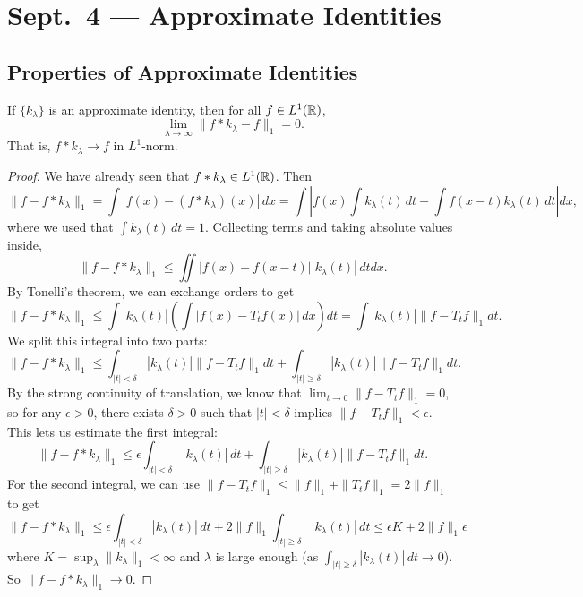 \chapter{Sept.~4 --- Approximate Identities}

\section{Properties of Approximate Identities}

\begin{theorem}
  If $\{k_{\lambda}\}$ is an approximate
  identity, then for all $f \in L^1(\mathbb{R})$,
  \[
    \lim_{\lambda \to \infty} \|f * k_{\lambda} - f\|_1 = 0.
  \]
  That is, $f * k_{\lambda} \to f$ in $L^1$-norm.
\end{theorem}

\begin{proof}
  We have already seen that
  $f * k_{\lambda} \in L^1(\mathbb{R})$. Then
  \[
    \|f - f * k_{\lambda}\|_1
    = \int |f(x) - (f * k_{\lambda})(x)| \, dx
    = \int \left|f(x) \int k_{\lambda}(t)\, dt - \int f(x - t)k_\lambda(t)\, dt\right| dx,
  \]
  where we used that
  $\int k_{\lambda}(t)\, dt = 1$.
  Collecting terms and taking absolute
  values inside,
  \[
    \|f - f * k_{\lambda}\|_1
    \le \iint |f(x) - f(x - t)| |k_{\lambda}(t)|\, dt dx.
  \]
  By Tonelli's theorem, we can
  exchange orders to get
  \[
    \|f - f * k_{\lambda}\|_1
    \le \int |k_{\lambda}(t)| \left(\int |f(x) - T_t f(x)|\, dx\right) dt
    = \int |k_{\lambda}(t)| \|f - T_t f\|_1 dt.
  \]
  We split this integral into two parts:
  \[
    \|f - f * k_{\lambda}\|_1
    \le \int_{|t| < \delta} |k_{\lambda}(t)| \|f - T_t f\|_1 dt
    + \int_{|t| \ge \delta} |k_{\lambda}(t)| \|f - T_t f\|_1 dt.
  \]
  By the strong continuity of translation,
  we know that $\lim_{t \to 0} \|f - T_t f\|_1 = 0$,
  so for any $\epsilon > 0$, there exists
  $\delta > 0$ such that
  $|t| < \delta$ implies
  $\|f - T_t f\|_1 < \epsilon$.
  This lets us estimate the first integral:
  \[
    \|f - f * k_{\lambda}\|_1
    \le \epsilon \int_{|t| < \delta} |k_{\lambda}(t)|\, dt
    + \int_{|t| \ge \delta} |k_{\lambda}(t)| \|f - T_t f\|_1 dt.
  \]
  For the second integral, we can use
  $\|f - T_t f\|_1 \le \|f\|_1 + \|T_t f\|_1 = 2\|f\|_1$ to get
  \[
    \|f - f * k_{\lambda}\|_1
    \le \epsilon \int_{|t| < \delta} |k_{\lambda}(t)|\, dt
    + 2\|f\|_1 \int_{|t| \ge \delta} |k_{\lambda}(t)|\, dt
    \le \epsilon K + 2 \|f\|_1 \epsilon
  \]
  where $K = \sup_{\lambda} \|k_{\lambda}\|_1 < \infty$ and
  $\lambda$ is large enough (as
  $\int_{|t| \ge \delta} |k_{\lambda}(t)|\, dt \to 0$).
  So $\|f - f * k_{\lambda}\|_1 \to 0$.
\end{proof}

